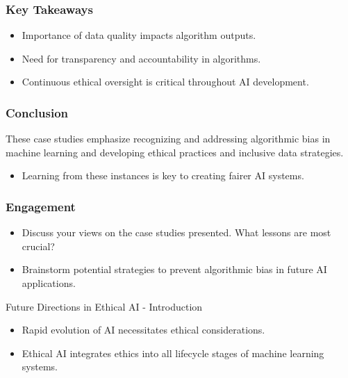 \documentclass[aspectratio=169]{beamer}
\begin{document}
\begin{frame}[fragile]
    \frametitle{Key Takeaways}
    \begin{itemize}
        \item Importance of data quality impacts algorithm outputs.
        \item Need for transparency and accountability in algorithms.
        \item Continuous ethical oversight is critical throughout AI development.
    \end{itemize}
\end{frame}

\begin{frame}[fragile]
    \frametitle{Conclusion}
    \begin{block}{}
        These case studies emphasize recognizing and addressing algorithmic bias in machine learning and developing ethical practices and inclusive data strategies.
    \end{block}
    \begin{itemize}
        \item Learning from these instances is key to creating fairer AI systems.
    \end{itemize}
\end{frame}

\begin{frame}[fragile]
    \frametitle{Engagement}
    \begin{itemize}
        \item Discuss your views on the case studies presented. What lessons are most crucial?
        \item Brainstorm potential strategies to prevent algorithmic bias in future AI applications.
    \end{itemize}
\end{frame}

\begin{frame}[fragile]{Future Directions in Ethical AI - Introduction}
    \begin{itemize}
        \item Rapid evolution of AI necessitates ethical considerations.
        \item Ethical AI integrates ethics into all lifecycle stages of machine learning systems.
    \end{itemize}
\end{frame}
\end{document}
